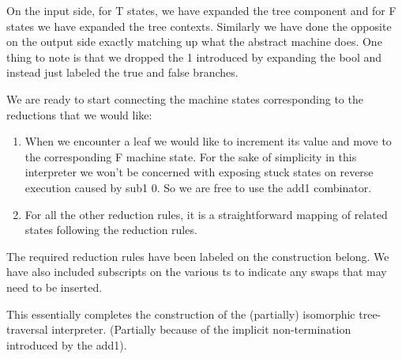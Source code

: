 \documentclass{llncs}
\begin{document}
{On the input side, for {{T}} states, we have expanded the tree component and
for {{F}} states we have expanded the tree contexts. Similarly we have done
the opposite on the output side exactly matching up what the abstract machine
does. One thing to note is that we dropped the {{1}} introduced by expanding
the {{bool}} and instead just labeled the {{true}} and {{false}} branches.

We are ready to start connecting the machine states corresponding to
the reductions that we would like:
\begin{enumerate}
\item When we encounter a leaf we would like to increment its value and move
  to the corresponding {{F}} machine state. For the sake of simplicity in
  this interpreter we won't be concerned with exposing stuck states on
  reverse execution caused by {{sub1 0}}. So we are free to use the {{add1}}
  combinator.

\item For all the other reduction rules, it is a straightforward mapping of
  related states following the reduction rules.

\end{enumerate}

The required reduction rules have been labeled on the construction
belong. We have also included subscripts on the various {{t}}s to
indicate any swaps that may need to be inserted.

\begin{center}
\end{center}

This essentially completes the construction of the (partially)
isomorphic tree-traversal interpreter. (Partially because of the
implicit non-termination introduced by the {{add1}}).


}
\end{document}
